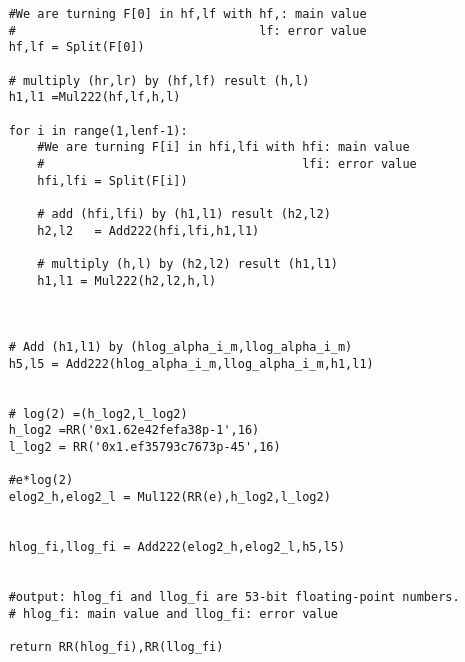 \begin{lstlisting}
    #We are turning F[0] in hf,lf with hf,: main value
    #                                  lf: error value
    hf,lf = Split(F[0])

    # multiply (hr,lr) by (hf,lf) result (h,l)
    h1,l1 =Mul222(hf,lf,h,l)

    for i in range(1,lenf-1):
        #We are turning F[i] in hfi,lfi with hfi: main value
        #                                    lfi: error value
        hfi,lfi = Split(F[i])

        # add (hfi,lfi) by (h1,l1) result (h2,l2)
        h2,l2   = Add222(hfi,lfi,h1,l1)

        # multiply (h,l) by (h2,l2) result (h1,l1)
        h1,l1 = Mul222(h2,l2,h,l)
        
    
    
    # Add (h1,l1) by (hlog_alpha_i_m,llog_alpha_i_m)
    h5,l5 = Add222(hlog_alpha_i_m,llog_alpha_i_m,h1,l1)
    
    
    # log(2) =(h_log2,l_log2)
    h_log2 =RR('0x1.62e42fefa38p-1',16)
    l_log2 = RR('0x1.ef35793c7673p-45',16)
    
    #e*log(2)
    elog2_h,elog2_l = Mul122(RR(e),h_log2,l_log2)
   

    hlog_fi,llog_fi = Add222(elog2_h,elog2_l,h5,l5)
    
    
    #output: hlog_fi and llog_fi are 53-bit floating-point numbers.
    # hlog_fi: main value and llog_fi: error value
    
    return RR(hlog_fi),RR(llog_fi)
\end{lstlisting}

